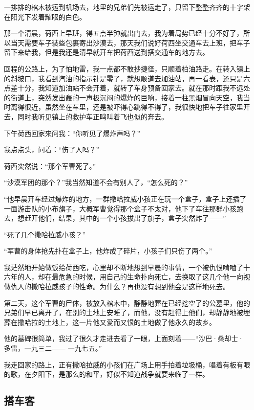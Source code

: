 \par 一排排的棺木被运到机场去，地里的兄弟们先被运走了，只留下整整齐齐的十字架在阳光下发着耀眼的白色。
\par 那一个清晨，荷西上早班，得五点半钟就出门去，我为着局势已经十分不好了，所以当天需要车子装些包裹寄出沙漠去，那天我们说好荷西坐交通车去上班，把车子留下来给我，但是我还是清早就开车把荷西送到搭交通车的地方去。
\par 回程的公路上，为了怕地雷，我一点都不敢抄捷径，只顺着柏油路走。在转入镇上的斜坡口，我看到汽油的指示针是零了，就想顺道去加油站，再一看表，还只是六点差十分，我知道加油站不会开着，就转了车身预备回家去。就在那时距我不远处的街道上，突然发出轰的一声极沉闷的爆炸的巨响，接着一柱黑烟冒向天空，我当时离得很近，虽然坐在车里，还是被吓得心跳得不得了，我很快地把车子往家里开去，同时我听见镇上的救护车正鸣叫着飞也似的奔去。
\par 下午荷西回家来问我：“你听见了爆炸声吗？”
\par 我点点头，问着：“伤了人吗？”
\par 荷西突然说：“那个军曹死了。”
\par “沙漠军团的那个？”我当然知道不会有别人了，“怎么死的？”
\par “他早晨开车经过爆炸的地方，一群撒哈拉威小孩正在玩一个盒子，盒子上还插了一面游击队的小布旗子，大概军曹觉得那个盒子不太对，他下了车往那群小孩跑去，想赶开他们，结果，其中的一个小孩拔出了旗子，盒子突然炸了——”
\par “死了几个撒哈拉威小孩？”
\par “军曹的身体抢先扑在盒子上，他炸成了碎片，小孩子们只伤了两个。”
\par 我茫然地开始做饭给荷西吃，心里却不断地想到早晨的事情，一个被仇恨啃啮了十六年的人，却在最危急的时候，用自己的生命扑向死亡，去换取了这几个他一向视做仇人的撒哈拉威孩子的性命。为什么？再也没有想到他会是这样地死去。
\par 第二天，这个军曹的尸体，被放入棺木中，静静地葬在已经挖空了的公墓里，他的兄弟们早已离开了，在别的土地上安睡了，而他，没有赶得上他们，却静静地被埋葬在撒哈拉的土地上，这一片他又爱而又恨的土地做了他永久的故乡。
\par 他的墓碑很简单，我过了很久才走进去看了一眼，上面刻着——“沙巴·桑却士·多雷，一九三二—— 一九七五。”
\par 我走回家的路上，正有撒哈拉威的小孩们在广场上用手拍着垃圾桶，唱着有板有眼的歌，在夕阳下，是那么的和平，好似不知道战争就要来临了一样。

\subsection{搭车客}

